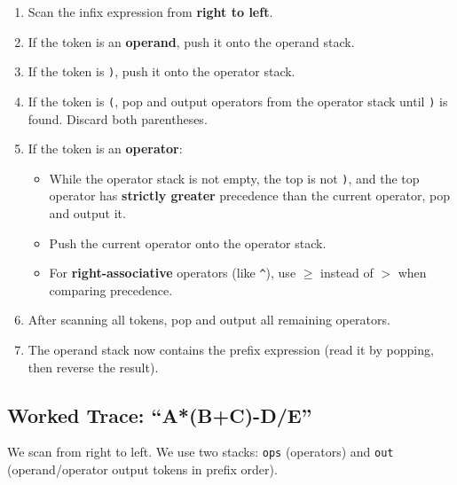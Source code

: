 \begin{enumerate}
\item Scan the infix expression from \textbf{right to left}.
\item If the token is an \textbf{operand}, push it onto the operand stack.
\item If the token is \texttt{)}, push it onto the operator stack.
\item If the token is \texttt{(}, pop and output operators from the operator stack until \texttt{)} is found. Discard both parentheses.
\item If the token is an \textbf{operator}:
    \begin{itemize}
    \item While the operator stack is not empty, the top is not \texttt{)}, and the top operator has \textbf{strictly greater} precedence than the current operator, pop and output it.
    \item Push the current operator onto the operator stack.
    \item For \textbf{right-associative} operators (like \texttt{\^{}}), use $\geq$ instead of $>$ when comparing precedence.
    \end{itemize}
\item After scanning all tokens, pop and output all remaining operators.
\item The operand stack now contains the prefix expression (read it by popping, then reverse the result).
\end{enumerate}

\subsection{Worked Trace: ``A*(B+C)-D/E''}

We scan from right to left. We use two stacks: \texttt{ops} (operators) and \texttt{out} (operand/operator output tokens in prefix order).


